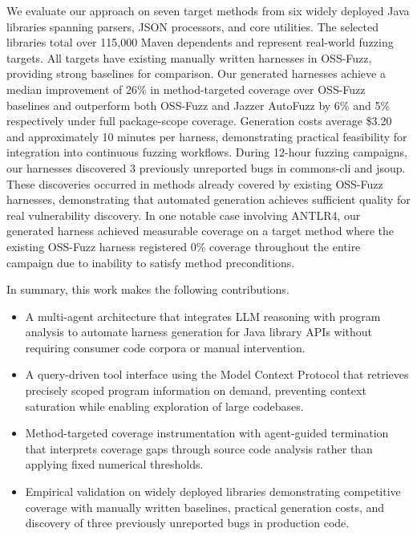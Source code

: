 We evaluate our approach on seven target methods from six widely deployed Java libraries spanning parsers, JSON processors, and core utilities. The selected libraries total over 115,000 Maven dependents and represent real-world fuzzing targets. All targets have existing manually written harnesses in OSS-Fuzz, providing strong baselines for comparison. Our generated harnesses achieve a median improvement of 26\% in method-targeted coverage over OSS-Fuzz baselines and outperform both OSS-Fuzz and Jazzer AutoFuzz by 6\% and 5\% respectively under full package-scope coverage. Generation costs average \$3.20 and approximately 10 minutes per harness, demonstrating practical feasibility for integration into continuous fuzzing workflows. During 12-hour fuzzing campaigns, our harnesses discovered 3 previously unreported bugs in commons-cli and jsoup. These discoveries occurred in methods already covered by existing OSS-Fuzz harnesses, demonstrating that automated generation achieves sufficient quality for real vulnerability discovery. In one notable case involving ANTLR4, our generated harness achieved measurable coverage on a target method where the existing OSS-Fuzz harness registered 0\% coverage throughout the entire campaign due to inability to satisfy method preconditions.


In summary, this work makes the following contributions.
\begin{itemize}
    \item A multi-agent architecture that integrates LLM reasoning with program analysis to automate harness generation for Java library APIs without requiring consumer code corpora or manual intervention.

    \item A query-driven tool interface using the Model Context Protocol that retrieves precisely scoped program information on demand, preventing context saturation while enabling exploration of large codebases.

    \item Method-targeted coverage instrumentation with agent-guided termination that interprets coverage gaps through source code analysis rather than applying fixed numerical thresholds.

    \item Empirical validation on widely deployed libraries demonstrating competitive coverage with manually written baselines, practical generation costs, and discovery of three previously unreported bugs in production code.
\end{itemize}
